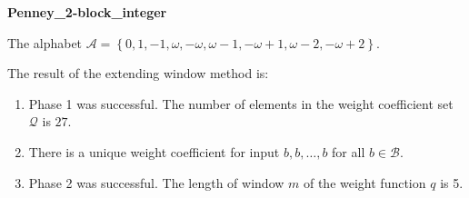 \begin{exmp}
\textbf{ Penney\_2-block\_integer }

\label{ex:Penney2-blockinteger}

The alphabet $\mathcal{A} =\left\{0, 1, -1, \omega, -\omega, \omega - 1, -\omega + 1, \omega - 2, -\omega + 2\right\}$.

The result of the extending window method is:
\begin{enumerate}
    \item Phase 1 was successful.
The number of elements in the weight coefficient set $\mathcal{Q}$ is $27$.

    \item There is a unique weight coefficient for input $b,b,\dots,b$ for all $b\in\mathcal{B}$.

    \item Phase 2 was successful.
The length of window $m$ of the weight function $q$ is 5.
\end{enumerate}
\end{exmp}
